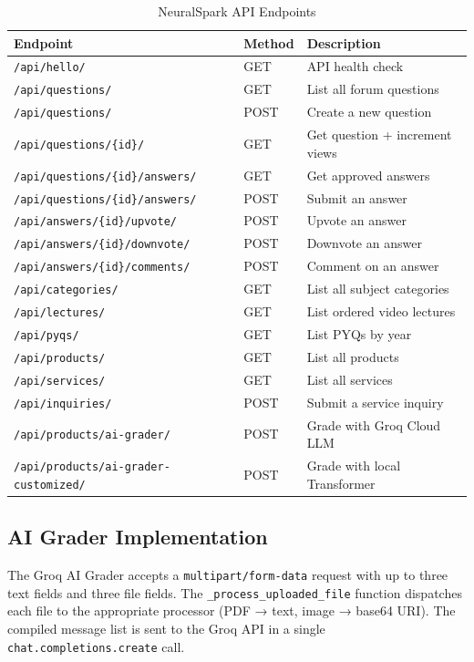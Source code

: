 \documentclass[12pt,a4paper]{report}
\begin{document}
\begin{table}[h!]
\centering
\begin{tabular}{@{}p{6cm}p{1.5cm}p{5cm}@{}}
\toprule
\textbf{Endpoint} & \textbf{Method} & \textbf{Description} \\
\midrule
\texttt{/api/hello/} & GET & API health check \\
\texttt{/api/questions/} & GET & List all forum questions \\
\texttt{/api/questions/} & POST & Create a new question \\
\texttt{/api/questions/\{id\}/} & GET & Get question + increment views \\
\texttt{/api/questions/\{id\}/answers/} & GET & Get approved answers \\
\texttt{/api/questions/\{id\}/answers/} & POST & Submit an answer \\
\texttt{/api/answers/\{id\}/upvote/} & POST & Upvote an answer \\
\texttt{/api/answers/\{id\}/downvote/} & POST & Downvote an answer \\
\texttt{/api/answers/\{id\}/comments/} & POST & Comment on an answer \\
\texttt{/api/categories/} & GET & List all subject categories \\
\texttt{/api/lectures/} & GET & List ordered video lectures \\
\texttt{/api/pyqs/} & GET & List PYQs by year \\
\texttt{/api/products/} & GET & List all products \\
\texttt{/api/services/} & GET & List all services \\
\texttt{/api/inquiries/} & POST & Submit a service inquiry \\
\texttt{/api/products/ai-grader/} & POST & Grade with Groq Cloud LLM \\
\texttt{/api/products/ai-grader-customized/} & POST & Grade with local Transformer \\
\bottomrule
\end{tabular}
\caption{NeuralSpark API Endpoints}
\label{tab:endpoints}
\end{table}

\subsection{AI Grader Implementation}
The Groq AI Grader accepts a \texttt{multipart/form-data} request with up to three text fields
and three file fields. The \texttt{\_process\_uploaded\_file} function dispatches each file
to the appropriate processor (PDF → text, image → base64 URI). The compiled message list is
sent to the Groq API in a single \texttt{chat.completions.create} call.
\end{document}
